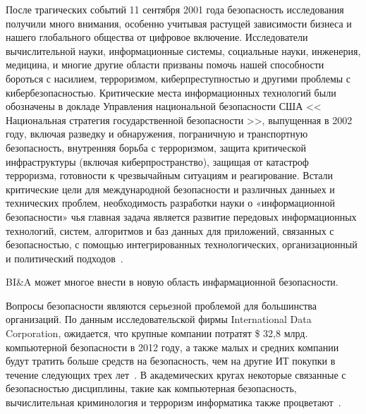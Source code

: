 После трагических событий 11 сентября 2001 года безопасность
исследования получили много внимания, особенно учитывая
растущей зависимости бизнеса и нашего глобального общества от
цифровое включение. Исследователи вычислительной науки,
информационные системы, социальные науки, инженерия, медицина,
и многие другие области призваны помочь
нашей способности бороться с насилием, терроризмом, киберпреступностью и другими
проблемы с кибербезопасностью. Критические места информационных технологий были обозначены в докладе Управления национальной безопасности США
<< Национальная стратегия государственной безопасности >>, выпущенная в 2002 году,
включая разведку и обнаружения, пограничную и транспортную
безопасность, внутренняя борьба с терроризмом, защита критической инфраструктуры
(включая киберпространство), защищая от катастроф
терроризма, готовности к чрезвычайным ситуациям и реагирование.
Встали критические цели для международной безопасности и
различных данныех и технических проблем, необходимость разработки
науки о «информационной безопасности» чья главная задача является развитие передовых информационных технологий, систем, алгоритмов и баз данных для приложений, связанных с безопасностью, с помощью интегрированных технологических,
организационный и политический подходов~\cite{Chen:2006}.

BI\&A может многое внести в новую область инфармационной безопасности.

Вопросы безопасности являются серьезной проблемой для большинства организаций.
По данным исследовательской фирмы International Data Corporation,
ожидается, что крупные компании потратят \$ 32,8 млрд.
компьютерной безопасности в 2012 году, а также малых и средних
компании будут тратить больше средств на безопасность, чем на другие ИТ
покупки в течение следующих трех лет~\cite{Perlroth:2012}.
В академических кругах некоторые связанные с безопасностью дисциплины, такие как
компьютерная безопасность, вычислительная криминология и терроризм
информатика также процветают~\cite{Brantingham:2011}.

